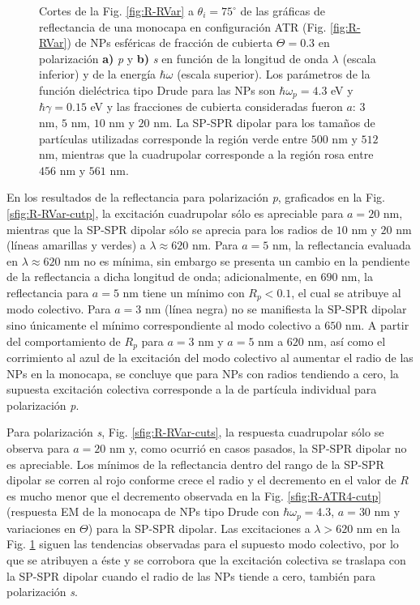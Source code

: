 \begin{figure}[h!]
	\caption{Cortes de la Fig. \ref{fig:R-RVar} a $\theta_i = 75^\circ$ de las gráficas de reflectancia de una monocapa en configuración ATR (Fig. \ref{fig:R-RVar}) de NPs esféricas de fracción de cubierta $\Theta = 0.3$ en polarización \textbf{a)} \emph{p} y \textbf{b)} \emph{s} en función de la longitud de onda $\lambda$ (escala inferior) y de la energía $\hbar\omega$ (escala superior). Los parámetros de la función dieléctrica tipo Drude para las NPs son $\hbar\omega_p = 4.3$ eV y $\hbar\gamma = 0.15$ eV y las fracciones de cubierta consideradas fueron $a$: $3$ nm, $5$ nm, $10$ nm y $20$ nm. La SP-SPR dipolar para los tamaños de partículas utilizadas corresponde la región verde entre $500$ nm y $512$ nm, mientras que la cuadrupolar corresponde a la región rosa entre $456$ nm y $561$ nm.}\label{fig:R-RVar-Cuts}
	\end{figure}	

En los resultados de la reflectancia para polarización \emph{p}, graficados en la Fig. \ref{sfig:R-RVar-cutp}, la excitación cuadrupolar sólo es apreciable para $a=20$ nm, mientras que la SP-SPR dipolar sólo se aprecia para los radios de $10$ nm y $20$ nm (líneas amarillas y verdes) a $\lambda\approx 620$ nm. Para $a=5$ nm, la reflectancia evaluada en $\lambda\approx 620$ nm no es mínima, sin embargo se presenta un cambio en la pendiente de la reflectancia a dicha longitud de onda; adicionalmente, en $690$ nm, la reflectancia para $a=5$ nm tiene un mínimo con $R_p<0.1$, el cual se atribuye al modo colectivo. Para $a=3$ nm (línea negra) no se manifiesta la SP-SPR dipolar sino únicamente el mínimo correspondiente al modo colectivo a $650$ nm. A partir del comportamiento de $R_p$ para $a=3$ nm y $a=5$ nm a $620$ nm, así como el corrimiento al azul de la excitación del modo colectivo al aumentar el radio de las NPs en la monocapa, se concluye que para NPs con radios tendiendo a cero, la supuesta excitación colectiva corresponde a la de partícula individual para polarización \emph{p}.
 
 Para polarización \emph{s}, Fig. \ref{sfig:R-RVar-cuts}, la respuesta cuadrupolar sólo se observa para $a = 20$ nm y, como ocurrió en casos pasados, la SP-SPR dipolar no es apreciable. Los mínimos de la reflectancia dentro del rango de la SP-SPR dipolar se corren al rojo conforme crece el radio y el decremento en el valor de $R$ es mucho menor que el decremento  observada en la Fig. \ref{sfig:R-ATR4-cutp} (respuesta EM de la monocapa de NPs tipo Drude con $\hbar\omega_p = 4.3$, $a = 30$ nm y variaciones en $\Theta$) para la SP-SPR dipolar. Las excitaciones a $\lambda>620$ nm en la Fig. \ref{fig:R-RVar-Cuts} siguen las tendencias observadas para el supuesto modo colectivo, por lo que se atribuyen a éste y se corrobora que la excitación colectiva se traslapa con la SP-SPR dipolar cuando el radio de las NPs tiende a cero, también para polarización \emph{s}.
 
